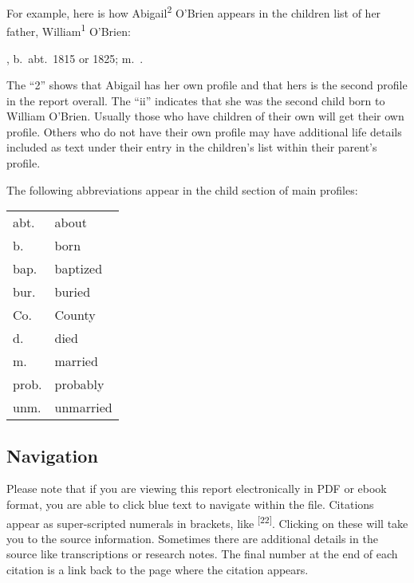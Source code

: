 For example, here is how Abigail\textsuperscript{2} O'Brien appears in the children list of her father, William\textsuperscript{1} O'Brien:

\vspace{\baselineskip}
	\begin{Kids}
	, b.\ abt.\ 1815 or 1825; m.\ .
	\end{Kids}
\vspace{\baselineskip}

The ``2'' shows that Abigail has her own profile and that hers is the second profile in the report overall. The ``ii'' indicates that she was the second child born to William O'Brien. Usually those who have children of their own will get their own profile. Others who do not have their own profile may have additional life details included as text under their entry in the children's list within their parent's profile.

The following abbreviations appear in the child section of main profiles:

\begin{center}
	\begin{tabular}{ll}
		abt. & about \\
		b. & born \\
		bap. & baptized \\
		bur. & buried \\
		Co. & County \\
		d. & died \\
		m. & married \\
		prob. & probably \\
		unm. & unmarried \\
	\end{tabular}
\end{center}

\subsection{Navigation}

Please note that if you are viewing this report electronically in PDF or ebook format, you are able to click blue text to navigate within the file. Citations appear as super-scripted numerals in brackets, like \textsuperscript{[22]}. Clicking on these will take you to the source information. Sometimes there are additional details in the source like transcriptions or research notes. The final number at the end of each citation is a link back to the page where the citation appears.

